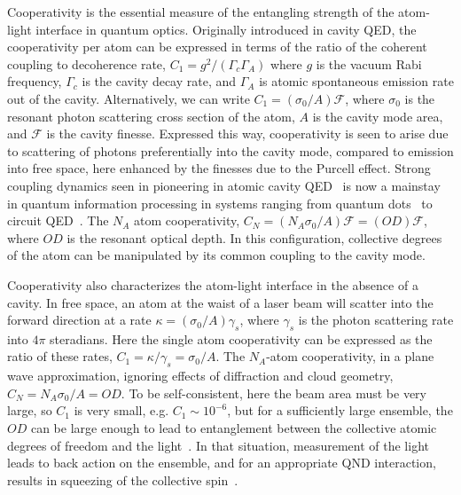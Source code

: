 \documentclass[preprint,aps,pra,onecolumn,superscriptaddress]{revtex4-1} %
\begin{document}
Cooperativity is the essential measure of the entangling strength of the atom-light interface in quantum optics.  Originally introduced in cavity QED, the cooperativity per atom can be expressed in terms of the ratio of the coherent coupling to decoherence rate, $C_1 = g^2/(\Gamma_c \Gamma_A)$ where $g$ is the vacuum Rabi frequency,  $\Gamma_c$ is the cavity decay rate, and $\Gamma_A$ is atomic spontaneous emission rate out of the cavity.  Alternatively, we can write $C_1 = (\sigma_0/A) \mathcal{F}$, where $\sigma_0$ is the resonant photon scattering cross section of the atom, $A$ is the cavity mode area, and $\mathcal{F}$ is the cavity finesse.  Expressed this way, cooperativity is seen to arise due to scattering of photons preferentially into the cavity mode, compared to emission into free space, here enhanced by the finesses due to the Purcell effect. Strong coupling dynamics seen in pioneering in atomic cavity QED~\cite{Aoki2006,Miller2005} is now a mainstay in quantum information processing in systems ranging from quantum dots~\cite{Akimov2007,Akopian2006,Liu2010} to circuit QED~\cite{Wallraff2004Strong,Vlastakis2013,Tosi2014}.  The $N_A$ atom cooperativity, $C_N = (N_A \sigma_0/A) \mathcal{F} =( OD) \mathcal{F}$, where $OD$ is the resonant optical depth.  In this configuration, collective degrees of the atom can be manipulated by its common coupling to the cavity mode.

Cooperativity also characterizes the atom-light interface in the absence of a cavity.  In free space, an atom at the waist of a laser beam will scatter into the forward direction at a rate $\kappa = (\sigma_0/A) \gamma_s$, where $\gamma_s$ is the photon scattering rate into $4 \pi$ steradians.  Here the single atom cooperativity can be expressed as the ratio of these rates, $C_1 = \kappa/\gamma_s = \sigma_0/A$.  The $N_A$-atom cooperativity, in a plane wave approximation, ignoring effects of diffraction and cloud geometry, $C_N = N_A \sigma_0/A = OD$.  To be self-consistent, here the beam area must be very large, so $C_1$ is very small, e.g. $C_1 \sim 10^{-6}$, but for a sufficiently large ensemble, the $OD$ can be large enough to lead to entanglement between the collective atomic degrees of freedom and the light~\cite{Kuzmich1998,Takahashi1999Quantum}.  In that situation, measurement of the light leads to back action on the ensemble, and for an appropriate QND interaction, results in squeezing of the collective spin~\cite{Madsen2004Spin,Kuzmich2000}.
\end{document}
